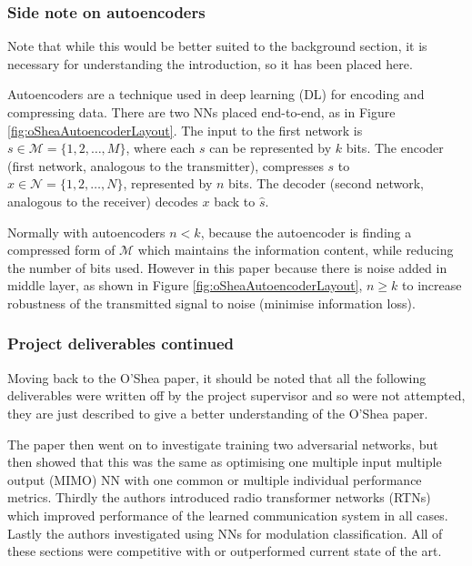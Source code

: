 \documentclass[12pt,onecolumn,letterpaper]{article}
\begin{document}
\subsubsection{Side note on autoencoders}

Note that while this would be better suited to the background section, it is necessary for understanding the introduction, so it has been placed here.

Autoencoders are a technique used in deep learning (DL) for encoding and compressing data. There are two NNs placed end-to-end, as in Figure \ref{fig:oSheaAutoencoderLayout}. The input to the first network is $s \in \mathcal{M} = \{1,2,\dots,M\}$, where each $s$ can be represented by $k$ bits. The encoder (first network, analogous to the transmitter), compresses $s$ to $x \in \mathcal{N} = \{1,2,\dots,N\}$, represented by $n$ bits. The decoder (second network, analogous to the receiver) decodes $x$ back to $\hat{s}$.

Normally with autoencoders $n < k$, because the autoencoder is finding a compressed form of $\mathcal{M}$ which maintains the information content, while reducing the number of bits used. However in this paper because there is noise added in middle layer, as shown in Figure \ref{fig:oSheaAutoencoderLayout}, $n \geq k$ to increase robustness of the transmitted signal to noise (minimise information loss).

\subsubsection{Project deliverables continued}
\label{sec:deliverables}

Moving back to the O'Shea paper, it should be noted that all the following deliverables were written off by the project supervisor and so were not attempted, they are just described to give a better understanding of the O'Shea paper. 

The paper then went on to investigate training two adversarial networks, but then showed that this was the same as optimising one multiple input multiple output (MIMO) NN with one common or multiple individual performance metrics. Thirdly the authors introduced radio transformer networks (RTNs) which improved performance of the learned communication system in all cases. Lastly the authors investigated using NNs for modulation classification. All of these sections were competitive with or outperformed current state of the art. 
\end{document}
